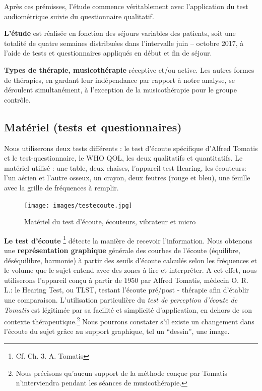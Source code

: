 Après ces prémisses, l'étude commence véritablement avec l'application du test
audiométrique suivie du questionnaire qualitatif.

\textbf{L'étude} est
réalisée en fonction des séjours variables des patients, soit une
totalité  de quatre semaines
distribuées dans l'intervalle juin --
octobre 2017,  à l'aide de tests et questionnaires appliqués en début
et fin de séjour.

\textbf{Types de thérapie, musicothérapie} réceptive et/ou active.
Les autres for\-mes de thérapies, en gardant
leur indépendance par rapport à notre analyse, se déroulent simultanément, à
l'exception de la musicothérapie pour le groupe contrôle.

\subsection{Matériel (tests et questionnaires)}
	Nous utiliserons deux tests différents :
	le test d'écoute spécifique d'Alfred Tomatis
	et le test-questionnaire, le WHO QOL, les deux qualitatifs et quantitatifs.
  Le matériel utilisé : une table, deux chaises, l'appareil
  test Hearing, les écouteurs: l'un aérien et l'autre osseux, un crayon, deux
  feutres (rouge et bleu), une feuille avec la grille de fréquences à
  remplir.



          \begin{figure}
  \centering
  \texttt{[image: images/testecoute.jpg]}
  \caption[phototestecoute]{Matériel du test d'écoute, écouteurs, vibrateur et micro}

  \end{figure}

        \textbf{Le test d'écoute}
        \footnote{Cf. Ch. 3. A. Tomatis} détecte la manière de recevoir
        l'information.
Nous obtenons une
	\textbf{représentation graphique} générale des courbes de l'écoute
        (équilibre, déséquilibre, harmonie) à partir des seuils d'écoute
        calculés selon les fréquences et le volume que le sujet entend
        avec des zones à lire et interpréter.
	A cet effet, nous utiliserons l'appareil conçu à partir de 1950 par Alfred Tomatis, médecin
        O. R. L.: le Hearing Test, ou TLST, testant
        l'écoute pré/post - thérapie
        afin d'établir une comparaison.
        L'utilisation particulière du \textit{test de perception d'écoute de Tomatis}  est
légitimée par sa facilité et  simplicité d'application, en dehors de
son contexte thérapeutique.\footnote{Nous précisons qu'aucun support de la méthode conçue par
        Tomatis n'interviendra pendant les séances de musicothérapie.}
      Nous pourrons constater
      s'il existe un changement dans l'écoute du sujet grâce au support graphique, tel un ``dessin'',
      une image. %

